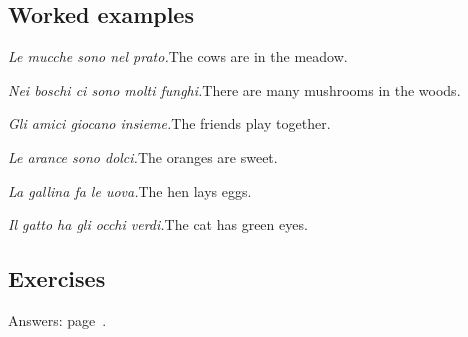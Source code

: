 \documentclass[11pt,a4paper,twoside,openright]{book}
\begin{document}
\subsection*{Worked examples}
\begin{examples}
\item\relax \textit{Le mucche sono nel prato.}\newline The cows are in the meadow.
\item\relax \textit{Nei boschi ci sono molti funghi.}\newline There are many mushrooms in the woods.
\item\relax \textit{Gli amici giocano insieme.}\newline The friends play together.
\item\relax \textit{Le arance sono dolci.}\newline The oranges are sweet.
\item\relax \textit{La gallina fa le uova.}\newline The hen lays eggs.
\item\relax \textit{Il gatto ha gli occhi verdi.}\newline The cat has green eyes.
\end{examples}

\subsection*{Exercises}\label{les:irregular-nouns:exercises}
{\color{muted}\small Answers: page~\pageref{ans:irregular-nouns}.}
\end{document}
